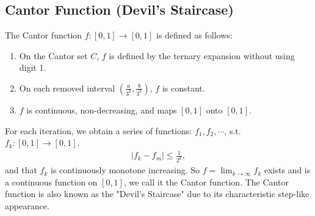 \subsection{Cantor Function (Devil's Staircase)}
\begin{definition}\label{def:cantor_function}
    The Cantor function $f: [0,1] \to [0,1]$ is defined as follows:
    \begin{enumerate}
        \item On the Cantor set $C$, $f$ is defined by the ternary expansion without using digit 1.
        \item On each removed interval $\left(\frac{a}{3^k}, \frac{b}{3^k} \right)$, $f$ is constant.
        \item $f$ is continuous, non-decreasing, and maps $[0,1]$ onto $[0,1]$.
    \end{enumerate}
    For each iteration, we obtain a series of functions: $f_1, f_2, \cdots$, s.t. $f_k: [0, 1] \to [0, 1]$.
    \begin{gather*}
        \vert f_k - f_m \vert \leq \frac{1}{2^k},
    \end{gather*}
    and that $f_k$ is continuously monotone increasing.
    So $f = \lim_{k \to \infty} f_k$ exists and is a continuous function on $[0,1]$, we call it the Cantor function.
    The Cantor function is also known as the "Devil's Staircase" due to its characteristic step-like appearance.
\end{definition}

